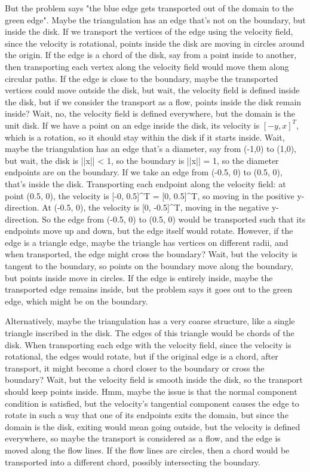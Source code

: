 But the problem says "the blue edge gets transported out of the domain to the green edge". Maybe the triangulation has an edge that's not on the boundary, but inside the disk. If we transport the vertices of the edge using the velocity field, since the velocity is rotational, points inside the disk are moving in circles around the origin. If the edge is a chord of the disk, say from a point inside to another, then transporting each vertex along the velocity field would move them along circular paths. If the edge is close to the boundary, maybe the transported vertices could move outside the disk, but wait, the velocity field is defined inside the disk, but if we consider the transport as a flow, points inside the disk remain inside? Wait, no, the velocity field is defined everywhere, but the domain is the unit disk. If we have a point on an edge inside the disk, its velocity is \( [-y, x]^T \), which is a rotation, so it should stay within the disk if it starts inside. Wait, maybe the triangulation has an edge that's a diameter, say from (-1,0) to (1,0), but wait, the disk is ||x|| < 1, so the boundary is ||x|| = 1, so the diameter endpoints are on the boundary. If we take an edge from (-0.5, 0) to (0.5, 0), that's inside the disk. Transporting each endpoint along the velocity field: at point (0.5, 0), the velocity is [-0, 0.5]^T = [0, 0.5]^T, so moving in the positive y-direction. At (-0.5, 0), the velocity is [0, -0.5]^T, moving in the negative y-direction. So the edge from (-0.5, 0) to (0.5, 0) would be transported such that its endpoints move up and down, but the edge itself would rotate. However, if the edge is a triangle edge, maybe the triangle has vertices on different radii, and when transported, the edge might cross the boundary? Wait, but the velocity is tangent to the boundary, so points on the boundary move along the boundary, but points inside move in circles. If the edge is entirely inside, maybe the transported edge remains inside, but the problem says it goes out to the green edge, which might be on the boundary. 

Alternatively, maybe the triangulation has a very coarse structure, like a single triangle inscribed in the disk. The edges of this triangle would be chords of the disk. When transporting each edge with the velocity field, since the velocity is rotational, the edges would rotate, but if the original edge is a chord, after transport, it might become a chord closer to the boundary or cross the boundary? Wait, but the velocity field is smooth inside the disk, so the transport should keep points inside. Hmm, maybe the issue is that the normal component condition is satisfied, but the velocity's tangential component causes the edge to rotate in such a way that one of its endpoints exits the domain, but since the domain is the disk, exiting would mean going outside, but the velocity is defined everywhere, so maybe the transport is considered as a flow, and the edge is moved along the flow lines. If the flow lines are circles, then a chord would be transported into a different chord, possibly intersecting the boundary. 

